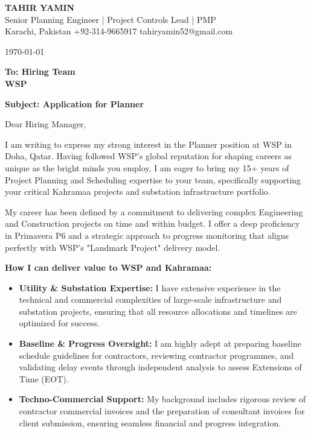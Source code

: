 \documentclass[11pt,a4paper]{article}
\begin{document}
\begin{center}
    {\Huge \textbf{\color{awesome-darknight} TAHIR YAMIN}} \\[0.2cm]
    {\Large \color{awesome-gray} Senior Planning Engineer | Project Controls Lead | PMP} \\[0.3cm]
    
    \small \color{light-gray}
    Karachi, Pakistan \quad \textbullet \quad 
    +92-314-9665917 \quad \textbullet \quad 
    tahiryamin52@gmail.com
\end{center}

\vspace{0.8cm}
\today
\vspace{0.5cm}

\textbf{To: Hiring Team} \\
\textbf{WSP} \\
\vspace{0.5cm}

\textbf{Subject: Application for Planner}

\vspace{0.5cm}

Dear Hiring Manager,

I am writing to express my strong interest in the Planner position at WSP in Doha, Qatar. Having followed WSP’s global reputation for shaping careers as unique as the bright minds you employ, I am eager to bring my 15+ years of Project Planning and Scheduling expertise to your team, specifically supporting your critical Kahramaa projects and substation infrastructure portfolio.

My career has been defined by a commitment to delivering complex Engineering and Construction projects on time and within budget. I offer a deep proficiency in Primavera P6 and a strategic approach to progress monitoring that aligns perfectly with WSP’s "Landmark Project" delivery model.

\textbf{How I can deliver value to WSP and Kahramaa:}
\begin{itemize}
    \item \textbf{Utility \& Substation Expertise:} I have extensive experience in the technical and commercial complexities of large-scale infrastructure and substation projects, ensuring that all resource allocations and timelines are optimized for success.
    \item \textbf{Baseline \& Progress Oversight:} I am highly adept at preparing baseline schedule guidelines for contractors, reviewing contractor programmes, and validating delay events through independent analysis to assess Extensions of Time (EOT).
    \item \textbf{Techno-Commercial Support:} My background includes rigorous review of contractor commercial invoices and the preparation of consultant invoices for client submission, ensuring seamless financial and progress integration.
\end{itemize}
\end{document}
